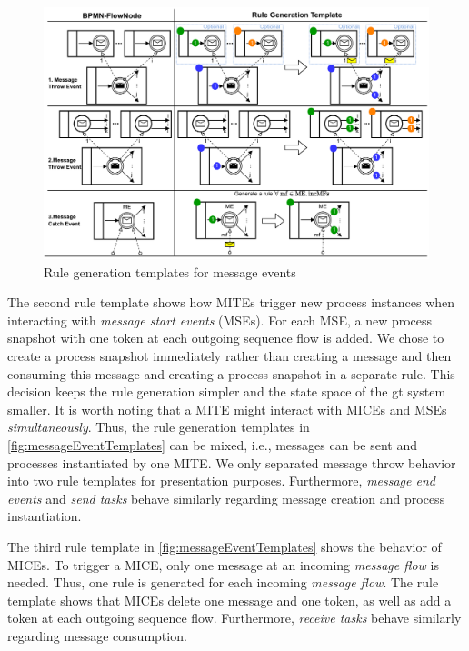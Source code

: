 \documentclass[runningheads]{llncs}
\begin{document}
\begin{figure}[ht]
    \centering
    \includegraphics[width=1\textwidth]{images/bpmn_semantics-message_templates.pdf}
    \caption{Rule generation templates for message events}
    \label{fig:messageEventTemplates}
\end{figure}

The second rule template shows how MITEs trigger new process instances when interacting with \textit{message start events} (MSEs).
For each MSE, a new process snapshot with one token at each outgoing sequence flow is added.
We chose to create a process snapshot immediately rather than creating a message and then consuming this message and creating a process snapshot in a separate rule.
This decision keeps the rule generation simpler and the state space of the \gls*{gt} system smaller.
It is worth noting that a MITE might interact with MICEs and MSEs \textit{simultaneously}.
Thus, the rule generation templates in \autoref{fig:messageEventTemplates} can be mixed, i.e., messages can be sent and processes instantiated by one MITE.
We only separated message throw behavior into two rule templates for presentation purposes.
Furthermore, \textit{message end events} and \textit{send tasks} behave similarly regarding message creation and process instantiation.

The third rule template in \autoref{fig:messageEventTemplates} shows the behavior of MICEs.
To trigger a MICE, only one message at an incoming \textit{message flow} is needed.
Thus, one rule is generated for each incoming \textit{message flow}.
The rule template shows that MICEs delete one message and one token, as well as add a token at each outgoing sequence flow.
Furthermore, \textit{receive tasks} behave similarly regarding message consumption.
\end{document}
